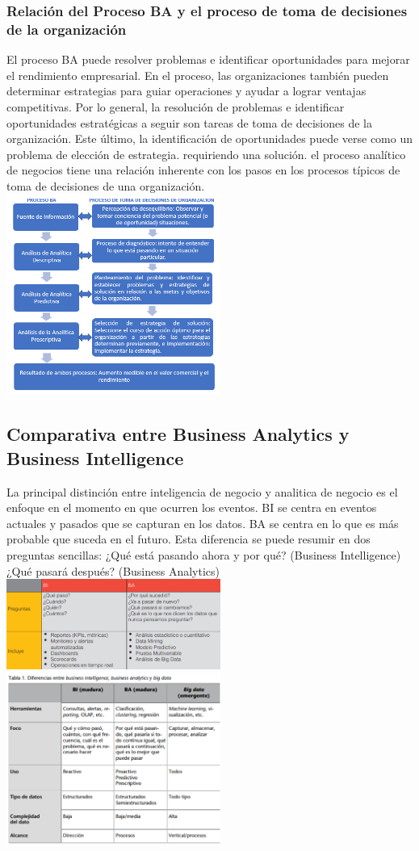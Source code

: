 \documentclass[twoside,twocolumn]{article}
\begin{document}
\subsubsection{Relación del Proceso BA y el proceso de toma de decisiones de la organización} 
El proceso BA puede resolver problemas e identificar oportunidades para mejorar el rendimiento empresarial. En el proceso, las organizaciones también pueden determinar estrategias para guiar operaciones y ayudar a lograr ventajas competitivas. Por lo general, la resolución de problemas e identificar oportunidades estratégicas a seguir son tareas de toma de decisiones de la organización.
Este último, la identificación de oportunidades puede verse como un problema de elección de estrategia. requiriendo una solución.  el proceso analítico de negocios tiene una relación inherente con los pasos en los procesos típicos de toma de decisiones de una organización.
\includegraphics[width=7cm]{imagenes/tomadecisiones.png}
\subsection{Comparativa entre Business Analytics y Business Intelligence}
La principal distinción entre inteligencia de negocio y analitica de negocio es el enfoque en el momento en que ocurren los eventos. BI se centra en eventos actuales y pasados que se capturan en los datos. BA se centra en lo que es más probable que suceda en el futuro.  Esta diferencia se puede resumir en dos preguntas sencillas:
¿Qué está pasando ahora y por qué? (Business Intelligence)
¿Qué pasará después? (Business Analytics) 
\includegraphics[width=7cm]{imagenes/comparativa1.png}
\includegraphics[width=7cm]{imagenes/comparativa2.png}
\end{document}
